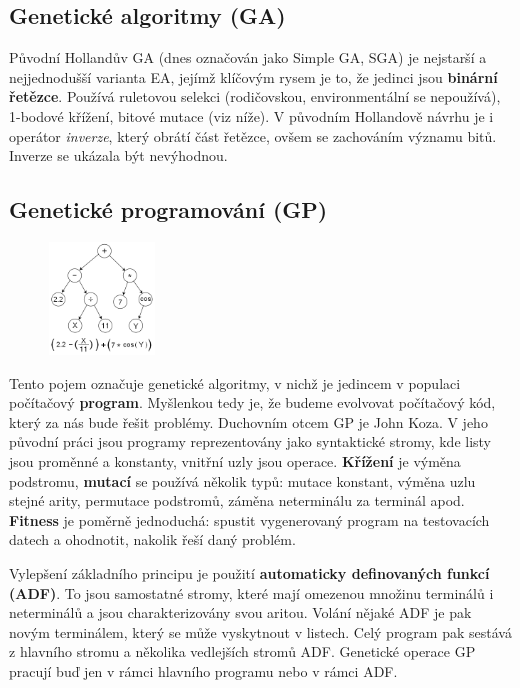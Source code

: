 \subsection{Genetické algoritmy (GA)}
Původní Hollandův GA (dnes označován jako Simple GA, SGA) je nejstarší a nejjednodušší varianta EA, jejímž klíčovým rysem je to, že jedinci jsou \textbf{binární řetězce}. Používá ruletovou selekci (rodičovskou, environmentální se nepoužívá), 1-bodové křížení, bitové mutace (viz níže). V původním Hollandově návrhu je i operátor \textit{inverze}, který obrátí část řetězce, ovšem se zachováním významu bitů. Inverze se ukázala být nevýhodnou.



\subsection{Genetické programování (GP)}
\begin{figure}
\centering
\includegraphics[width=0.25\textwidth]{img/gp.png}
\end{figure}
Tento pojem označuje genetické algoritmy, v nichž je jedincem v populaci počítačový \textbf{program}. Myšlenkou tedy je, že budeme evolvovat počítačový kód, který za nás bude řešit problémy. Duchovním otcem GP je John Koza. V jeho původní práci jsou programy reprezentovány jako syntaktické stromy, kde listy jsou proměnné a konstanty, vnitřní uzly jsou operace. \textbf{Křížení} je výměna podstromu, \textbf{mutací} se používá několik typů: mutace konstant, výměna uzlu stejné arity, permutace podstromů, záměna neterminálu za terminál apod. \textbf{Fitness} je poměrně jednoduchá: spustit vygenerovaný program na testovacích datech a ohodnotit, nakolik řeší daný problém.

Vylepšení základního principu je použití \textbf{automaticky definovaných funkcí (ADF)}. To jsou samostatné stromy, které mají omezenou množinu terminálů i neterminálů a jsou charakterizovány svou aritou. Volání nějaké ADF je pak novým terminálem, který se může vyskytnout v listech. Celý program pak sestává z hlavního stromu a několika vedlejších stromů ADF. Genetické operace GP pracují buď jen v rámci hlavního programu nebo v rámci ADF.

